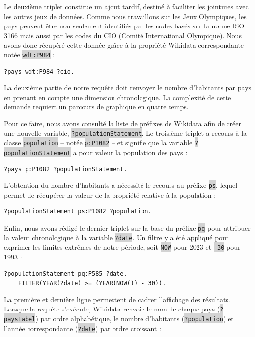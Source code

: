 \documentclass[hidelinks, 12pt]{article}
\newcommand{\code}[1]{\colorbox{LightGray}{\texttt{#1}}}
\begin{document}
Le deuxième triplet constitue un ajout tardif, destiné à faciliter les jointures avec les autres jeux de données. Comme nous travaillons sur les Jeux Olympiques, les pays peuvent être non seulement identifiés par les codes basés sur la norme ISO 3166 mais aussi par les codes du CIO (Comité International Olympique). Nous avons donc récupéré cette donnée grâce à la propriété Wikidata correspondante -- notée \code{wdt:P984} :

\begin{lstlisting}[language=SPARQL]
	?pays wdt:P984 ?cio.
\end{lstlisting}

La deuxième partie de notre requête doit renvoyer le nombre d'habitants par pays en prenant en compte une dimension chronologique. La complexité de cette demande requiert un parcours de graphique en quatre temps.

Pour ce faire, nous avons consulté la liste de préfixes\autocite{wikiprefixes} de Wikidata afin de créer une nouvelle variable, \code{?populationStatement}. Le troisième triplet a recours à la classe \code{population} -- notée \code{p:P1082} -- et signifie que la variable \code{?populationStatement} a pour valeur la population des pays :

\begin{lstlisting}[language=SPARQL]
	?pays p:P1082 ?populationStatement.
\end{lstlisting}

L'obtention du nombre d'habitants a nécessité le recours au préfixe \code{ps}, lequel permet de récupérer la valeur de la propriété relative à la population :
		
\begin{lstlisting}[language=SPARQL]
	?populationStatement ps:P1082 ?population.
\end{lstlisting}

Enfin, nous avons rédigé le dernier triplet sur la base du préfixe \code{pq} pour attribuer la valeur chronologique à la variable \code{?date}. Un filtre y a été appliqué pour exprimer les limites extrêmes de notre période, soit \code{NOW} pour 2023 et \code{-30} pour 1993 :
	
\begin{lstlisting}[language=SPARQL]
	?populationStatement pq:P585 ?date.
	FILTER(YEAR(?date) >= (YEAR(NOW()) - 30)).
\end{lstlisting}

La première et dernière ligne permettent de cadrer l'affichage des résultats. Lorsque la requête s'exécute, Wikidata renvoie le nom de chaque pays (\code{?paysLabel}) par ordre alphabétique, le nombre d'habitants (\code{?population}) et l'année correspondante (\code{?date}) par ordre croissant :
\end{document}
